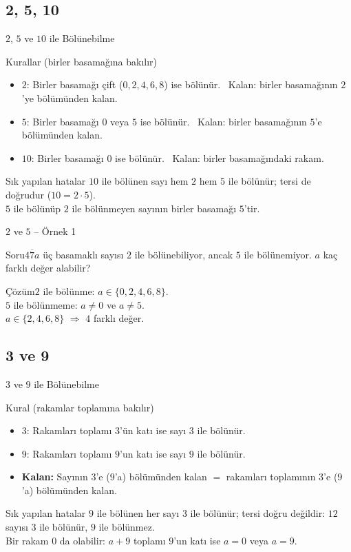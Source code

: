 \documentclass[aspectratio=169,11pt]{beamer}
\newcommand{\soru}[3]{%
\begin{frame}{#1}
  \begin{block}{Soru}\large #2\end{block}
  \pause
  \begin{exampleblock}{Çözüm}\large #3\end{exampleblock}
\end{frame}}
\newcommand{\ab}[1]{\overline{#1}}
\begin{document}
\subsection{2, 5, 10}
\begin{frame}{\(2\), \(5\) ve \(10\) ile Bölünebilme}
\begin{block}{Kurallar (birler basamağına bakılır)}
\begin{itemize}
\item \(2\): Birler basamağı çift (\(0,2,4,6,8\)) ise bölünür. \ Kalan: birler basamağının \(2\)'ye bölümünden kalan.
\item \(5\): Birler basamağı \(0\) veya \(5\) ise bölünür. \ Kalan: birler basamağının \(5\)'e bölümünden kalan.
\item \(10\): Birler basamağı \(0\) ise bölünür. \ Kalan: birler basamağındaki rakam.
\end{itemize}
\end{block}
\begin{alertblock}{Sık yapılan hatalar}
\(10\) ile bölünen sayı hem \(2\) hem \(5\) ile bölünür; tersi de doğrudur (\(10=2\cdot 5\)).\\
\(5\) ile bölünüp \(2\) ile bölünmeyen sayının birler basamağı \(5\)'tir.
\end{alertblock}
\end{frame}

\soru{\(2\) ve \(5\) -- Örnek 1}
{\(\ab{47a}\) üç basamaklı sayısı \(2\) ile bölünebiliyor, ancak \(5\) ile bölünemiyor. \(a\) kaç farklı değer alabilir?}
{\(2\) ile bölünme: \(a\in\{0,2,4,6,8\}\).\\[3pt]
\(5\) ile bölünmeme: \(a\neq 0\) ve \(a\neq 5\).\\[3pt]
\(a\in\{2,4,6,8\}\) \(\Rightarrow\) \(4\) farklı değer.}

\subsection{3 ve 9}
\begin{frame}{\(3\) ve \(9\) ile Bölünebilme}
\begin{block}{Kural (rakamlar toplamına bakılır)}
\begin{itemize}
\item \(3\): Rakamları toplamı \(3\)'ün katı ise sayı \(3\) ile bölünür.
\item \(9\): Rakamları toplamı \(9\)'un katı ise sayı \(9\) ile bölünür.
\item \textbf{Kalan:} Sayının \(3\)'e (\(9\)'a) bölümünden kalan \(=\) rakamları toplamının \(3\)'e (\(9\)'a) bölümünden kalan.
\end{itemize}
\end{block}
\begin{alertblock}{Sık yapılan hatalar}
\(9\) ile bölünen her sayı \(3\) ile bölünür; tersi doğru değildir: \(12\) sayısı \(3\) ile bölünür, \(9\) ile bölünmez.\\
Bir rakam \(0\) da olabilir: \(a+9\) toplamı \(9\)'un katı ise \(a=0\) veya \(a=9\).
\end{alertblock}
\end{frame}
\end{document}
